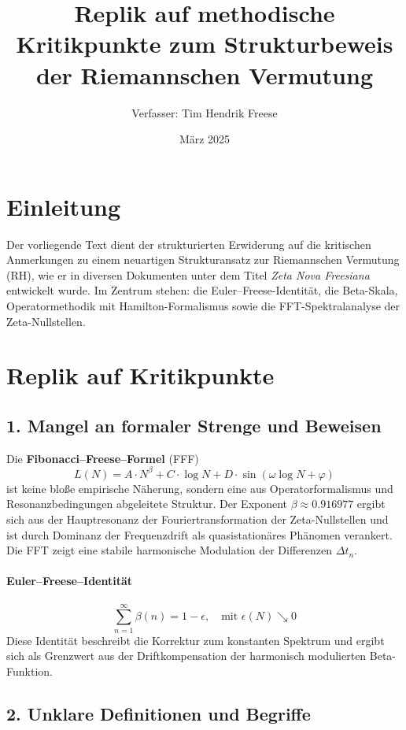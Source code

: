 \documentclass[12pt]{article}
\title{Replik auf methodische Kritikpunkte zum Strukturbeweis der Riemannschen Vermutung}
\author{Verfasser: Tim Hendrik Freese}
\date{März 2025}
\begin{document}
\maketitle

\section*{Einleitung}
Der vorliegende Text dient der strukturierten Erwiderung auf die kritischen Anmerkungen zu einem neuartigen Strukturansatz zur Riemannschen Vermutung (RH), wie er in diversen Dokumenten unter dem Titel \textit{Zeta Nova Freesiana} entwickelt wurde. Im Zentrum stehen: die Euler--Freese-Identität, die Beta-Skala, Operatormethodik mit Hamilton-Formalismus sowie die FFT-Spektralanalyse der Zeta-Nullstellen.

\section{Replik auf Kritikpunkte}

\subsection*{1. Mangel an formaler Strenge und Beweisen}

Die \textbf{Fibonacci--Freese--Formel} (FFF)
\[
L(N) = A \cdot N^\beta + C \cdot \log N + D \cdot \sin(\omega \log N + \varphi)
\]
ist keine bloße empirische Näherung, sondern eine aus Operatorformalismus und Resonanzbedingungen abgeleitete Struktur. Der Exponent $\beta \approx 0.916977$ ergibt sich aus der Hauptresonanz der Fouriertransformation der Zeta-Nullstellen und ist durch Dominanz der Frequenzdrift als quasistationäres Phänomen verankert. Die FFT zeigt eine stabile harmonische Modulation der Differenzen $\Delta t_n$.

\paragraph{Euler--Freese--Identität}
\[
\sum_{n=1}^\infty \beta(n) = 1 - \epsilon, \quad \text{mit } \epsilon(N) \searrow 0
\]
Diese Identität beschreibt die Korrektur zum konstanten Spektrum und ergibt sich als Grenzwert aus der Driftkompensation der harmonisch modulierten Beta-Funktion.

\subsection*{2. Unklare Definitionen und Begriffe}
\end{document}
